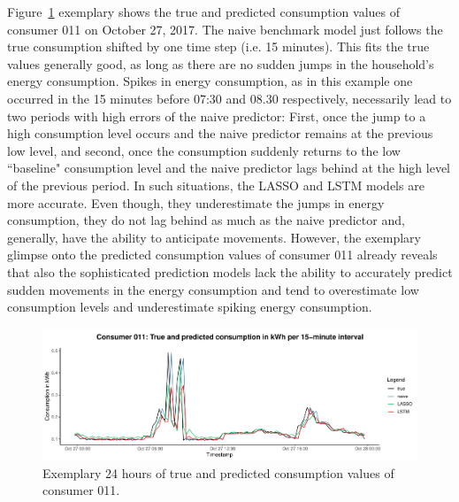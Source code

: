 Figure~\ref{Fig:glimpse_predcons} exemplary shows the true and predicted consumption values of consumer 011 on October 27, 2017. The naive benchmark model just follows the true consumption shifted by one time step (i.e. 15 minutes). This fits the true values generally good, as long as there are no sudden jumps in the household's energy consumption. Spikes in energy consumption, as in this example one occurred in the 15 minutes before 07:30 and 08.30 respectively, necessarily lead to two periods with high errors of the naive predictor: First, once the jump to a high consumption level occurs and the naive predictor remains at the previous low level, and second, once the consumption suddenly returns to the low ``baseline" consumption level and the naive predictor lags behind at the high level of the previous period. In such situations, the LASSO and LSTM models are more accurate. Even though, they underestimate the jumps in energy consumption, they do not lag behind as much as the naive predictor and, generally, have the ability to anticipate movements. However, the exemplary glimpse onto the predicted consumption values of consumer 011 already reveals that also the sophisticated prediction models lack the ability to accurately predict sudden movements in the energy consumption and tend to overestimate low consumption levels and underestimate spiking energy consumption.
%
\begin{figure}[htbp]
    \centering
    \includegraphics[width=\textwidth]{thesis/graphs/evaluation/c011_pred_cons.pdf}
    \caption[Exemplary 24 hours of true and predicted consumption values]{Exemplary 24 hours of true and predicted consumption values of consumer 011. \quantnet\href{}{}}
    \label{Fig:glimpse_predcons}
\end{figure}
%

